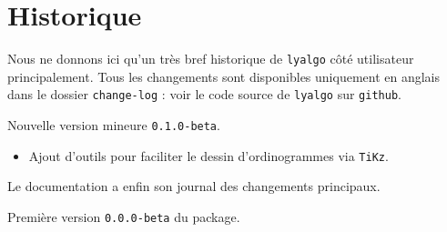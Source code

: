 \documentclass[12pt,a4paper]{article}
\begin{document}
\section{Historique}

Nous ne donnons ici qu'un très bref historique de \verb+lyalgo+ côté utilisateur principalement.
Tous les changements sont disponibles uniquement en anglais dans le dossier \verb+change-log+ : voir le code source de \verb+lyalgo+ sur \verb+github+.

\begin{description}[leftmargin=1em]
    \setlength\itemsep{1em}



    \item[2019-10-19] Nouvelle version mineure \verb+0.1.0-beta+.
    \begin{itemize}
        \item Ajout d'outils pour faciliter le dessin d'ordinogrammes via \verb+TiKz+.
    \end{itemize} 



    \item[2019-10-18] Le documentation a enfin son journal des changements principaux.



    \item[2019-09-03] Première version \verb+0.0.0-beta+ du package.
\end{description}
\end{document}
